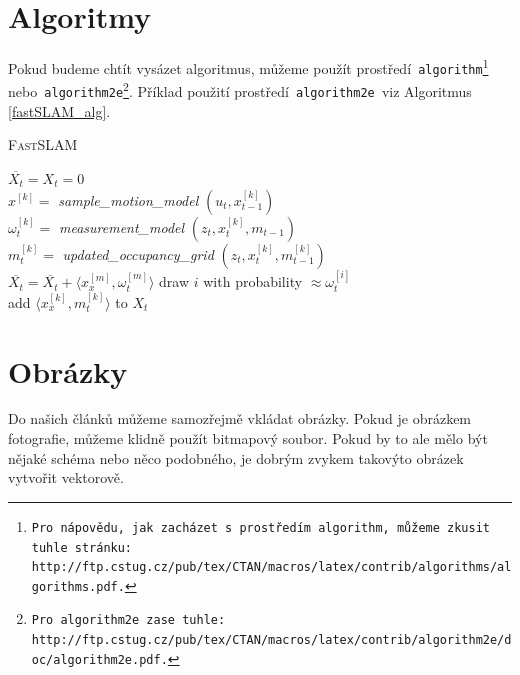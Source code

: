 \documentclass[a4paper, 11pt]{article}
\begin{document}
\section{Algoritmy}
\label{Alg}
Pokud budeme chtít vysázet algoritmus, můžeme použít prostředí\texttt{ algorithm\footnote{Pro nápovědu, jak zacházet s prostředím\texttt{ algorithm}, můžeme zkusit tuhle stránku:\\
http://ftp.cstug.cz/pub/tex/CTAN/macros/latex/contrib/algorithms/algorithms.pdf.} }nebo\texttt{ algorithm2e\footnote{Pro\texttt{ algorithm2e }zase tuhle: http://ftp.cstug.cz/pub/tex/CTAN/macros/latex/contrib/algorithm2e/doc/algorithm2e.pdf.}}.
Příklad použití prostředí\texttt{ algorithm2e }viz Algoritmus \ref{fastSLAM_alg}.
\bigskip
\begin{algorithm}
\caption{\textsc{FastSLAM}}
\label{fastSLAM_alg}
\SetNlSkip{-1em}
\SetInd{1em}{0em}
\SetNlSty{}{}{:}
\BlankLine
\Indp
\Indpp
$\overline{X_t} = X_t = 0$\\
{
    $x^{[k]} = $ \emph{sample\_motion\_model} $(u_t, x_{t-1}^{[k]})$\\
    $\omega_{t}^{[k]} = $ \emph{measurement\_model} $(z_{t},x_{t}^{[k]},m_{t-1})$\\
    $m_{t}^{[k]} = $ \emph{updated\_occupancy\_grid} $(z_{t},x_{t}^{[k]},m_{t-1}^{[k]})$\\
    $\overline{X_t} = \overline{X_t} + \langle x_{x}^{[m]},\omega_{t}^{[m]} \rangle$
}
{
    draw $i$ with probability $\approx \omega_{t}^{[i]}$\\
    add $\langle x_{x}^{[k]},m_{t}^{[k]}\rangle$ to $X_t$
}
\end{algorithm}

\section{Obrázky}
Do našich článků můžeme samozřejmě vkládat obrázky. Pokud je obrázkem fotografie, můžeme klidně použít
bitmapový soubor. Pokud by to ale mělo být nějaké schéma nebo něco podobného, je dobrým zvykem takovýto
obrázek vytvořit vektorově.
\end{document}
